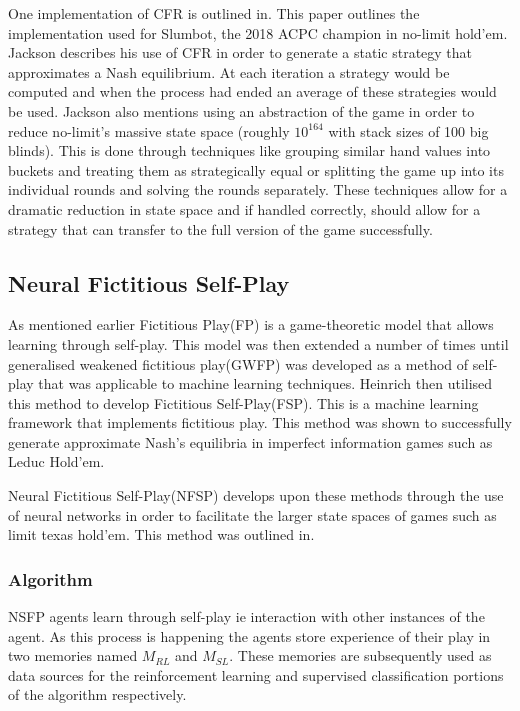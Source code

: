 One implementation of CFR is outlined in\citep{jackson2013slumbot}.
This paper outlines the implementation used for Slumbot, the 2018 ACPC champion
in no-limit hold'em.
Jackson describes his use of CFR in order to generate a static strategy that approximates
a Nash equilibrium.
At each iteration a strategy would be computed and when the process had ended an
average of these strategies would be used.
Jackson also mentions using an abstraction of the game in order to reduce no-limit's
massive state space (roughly $10^{164}$ with stack sizes of 100 big blinds)\citep{johanson2013measuring}.
This is done through techniques like grouping similar hand values into buckets and
treating them as strategically equal or splitting the game up into its individual rounds
and solving the rounds separately.
These techniques allow for a dramatic reduction in state space and if handled correctly,
should allow for a strategy that can transfer to the full version of the game successfully.


\subsection{Neural Fictitious Self-Play}\label{subsec:thNFSP}
As mentioned earlier Fictitious Play(FP) is a game-theoretic model that allows learning through self-play.
This model was then extended a number of times until generalised weakened fictitious play(GWFP) was developed as a
method of self-play that was applicable to machine learning techniques.
Heinrich then utilised this method to develop Fictitious Self-Play(FSP)\cite{heinrich2015fictitious}.
This is a machine learning framework that implements fictitious play.
This method was shown to successfully generate approximate Nash's equilibria in imperfect information games
such as Leduc Hold'em.

Neural Fictitious Self-Play(NFSP) develops upon these methods through the use of neural
networks in order to facilitate the larger state spaces of games such as limit texas hold'em.
This method was outlined in\cite{heinrich2016deep}.

\subsubsection{Algorithm}
NSFP agents learn through self-play ie interaction with other instances of the agent.
As this process is happening the agents store experience of their play in two memories
named $M_{RL}$ and $M_{SL}$.
These memories are subsequently used as data sources for the reinforcement learning and
supervised classification portions of the algorithm respectively.

